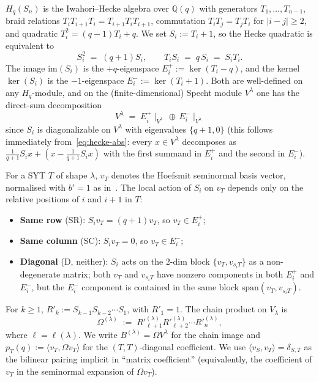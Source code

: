 \documentclass[11pt]{article}
\theoremstyle{definition}
\newcommand{\Hq}{H_q}
\newcommand{\Sn}{S_n}
\newcommand{\Vlam}{V^\lambda}
\newcommand{\Om}{\Omega}
\newcommand{\Rp}{{R'}}
\newcommand{\Eplus}{E^+}
\newcommand{\Eminus}{E^-}
\newcommand{\im}{\mathrm{im}}
\newcommand{\pT}{p_T}
\begin{document}
$\Hq(\Sn)$ is the Iwahori--Hecke algebra over $\mathbb{Q}(q)$ with
generators $T_1, \ldots, T_{n-1}$, braid relations
$T_i T_{i+1} T_i = T_{i+1} T_i T_{i+1}$, commutation
$T_i T_j = T_j T_i$ for $|i-j| \ge 2$, and quadratic
$T_i^2 = (q-1) T_i + q$. We set $S_i := T_i + 1$, so the Hecke
quadratic is equivalent to
\begin{equation}\label{eq:hecke-abs}
   S_i^2 \;=\; (q+1) S_i, \qquad T_i S_i \;=\; q\, S_i \;=\; S_i T_i.
\end{equation}
The image $\im(S_i)$ is the $+q$-eigenspace $\Eplus_i := \ker(T_i - q)$,
and the kernel $\ker(S_i)$ is the $-1$-eigenspace $\Eminus_i := \ker(T_i+1)$.
Both are well-defined on any $\Hq$-module, and on the (finite-dimensional)
Specht module $\Vlam$ one has the direct-sum decomposition
\begin{equation}\label{eq:plus-minus-decomp}
   \Vlam \;=\; \Eplus_i \!\mid_{\Vlam} \,\oplus\, \Eminus_i \!\mid_{\Vlam}
\end{equation}
since $S_i$ is diagonalizable on $\Vlam$ with eigenvalues $\{q+1, 0\}$
(this follows immediately from~\eqref{eq:hecke-abs}: every
$x \in \Vlam$ decomposes as $\frac{1}{q+1} S_i x + (x - \frac{1}{q+1} S_i x)$
with the first summand in $\Eplus_i$ and the second in $\Eminus_i$).

For a SYT $T$ of shape $\lambda$, $v_T$ denotes the Hoefsmit seminormal
basis vector, normalised with $b'\!=\!1$ as in~\cite{converse}. The local
action of $S_i$ on $v_T$ depends only on the relative positions of $i$ and
$i+1$ in $T$:
\begin{itemize}[topsep=0.2em,itemsep=0.1em]
\item \textbf{Same row} (SR): $S_i v_T = (q+1) v_T$, so $v_T \in \Eplus_i$;
\item \textbf{Same column} (SC): $S_i v_T = 0$, so $v_T \in \Eminus_i$;
\item \textbf{Diagonal} (D, neither): $S_i$ acts on the
   $2$-dim block $\{v_T, v_{s_i T}\}$ as a non-degenerate
   matrix; both $v_T$ and $v_{s_i T}$ have nonzero components in
   both $\Eplus_i$ and $\Eminus_i$, but the $\Eminus_i$ component is
   contained in the same block $\mathrm{span}(v_T, v_{s_i T})$.
\end{itemize}

For $k \ge 1$, $\Rp_k := S_{k-1} S_{k-2} \cdots S_1$, with $\Rp_1 = 1$.
The chain product on $V_\lambda$ is
\[
   \Om^{(\lambda)} \;:=\; \Rp_{\ell+1}^{(\lambda)} \Rp_{\ell+2}^{(\lambda)} \cdots \Rp_n^{(\lambda)},
\]
where $\ell = \ell(\lambda)$. We write $B^{(\lambda)} = \Om \Vlam$ for the
chain image and $\pT(q) := \langle v_T, \Om v_T \rangle$ for the
$(T,T)$-diagonal coefficient. We use $\langle v_S, v_T \rangle =
\delta_{S,T}$ as the bilinear pairing implicit in ``matrix coefficient''
(equivalently, the coefficient of $v_T$ in the seminormal expansion of
$\Om v_T$).
\end{document}
